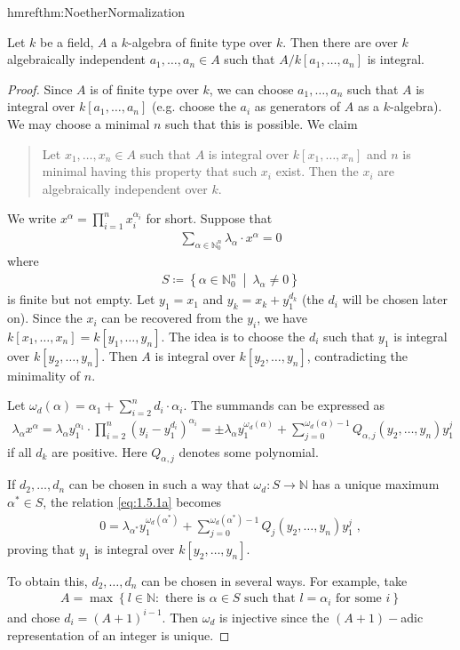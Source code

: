 \documentclass[DIV=14,parskip=full,pointednumbers]{scrartcl}
\theoremstyle{cthm}
\theoremstyle{cvarthm}
\theoremstyle{cdef}
\newcommand{\lbl}[1]{
	\label{#1}
	\edef\dummy{\curthm}
	\expandafter\xdef\csname thmref#1\endcsname{\dummy}
}
\newcommand{\IN}{\mathbb{N}}
\newcommand{\ldotspam}{,\ldots,}
\newcommand{\st}{\ \middle|\ }
\begin{document}
\begin{thm}\lbl{thm:NoetherNormalization}
 Let $k$ be a field, $A$ a $k$-algebra of finite type over $k$. Then there are over $k$ algebraically independent $a_1\ldotspam a_n\in A$ such that $A/k[a_1\ldotspam a_n]$ is integral.
\end{thm}
\begin{proof}
 Since $A$ is of finite type over $k$, we can choose $a_1,\ldots, a_n$ such that $A$ is integral over $k[a_1,\ldots, a_n]$ (e.g. choose the $a_i$ as generators of $A$ as a $k$-algebra). We may choose a minimal $n$ such that this is possible. We claim 
 \begin{quote}
  Let $x_1,\ldots, x_n\in A$ such that $A$ is integral over $k[x_1,\ldots,x_n]$ and $n$ is minimal having this property that such $x_i$ exist. Then the $x_i$ are algebraically independent over $k$.
 \end{quote}
We write $x^\alpha = \prod_{i=1}^n x_i^{\alpha_i}$ for short. Suppose that
\begin{align*}
\sum_{\alpha\in\IN_0^n} \lambda_\alpha \cdot x^\alpha =0\label{eq:1.5.1a}\tag{$*$}
\end{align*}
where 
\begin{align*}
 S\coloneqq \left\{\alpha\in\IN_0^n\st\lambda_\alpha\neq 0\right\}
\end{align*}
 is finite but not empty. Let $y_1=x_1$ and $y_k = x_k +y_1^{d_k}$ (the $d_i$ will be chosen later on). Since the $x_i$ can be recovered from the $y_i$, we have $k[x_1,\ldots,x_n] = k[y_1,\ldots,y_n]$. The idea is to choose the $d_i$ such that $y_1$ is integral over $k[y_2,\ldots,y_n]$. Then $A$ is integral over $k[y_2,\ldots,y_n]$, contradicting the minimality of $n$. 

Let $\omega_d(\alpha) =\alpha_1 +\sum_{i=2}^nd_i\cdot \alpha_i$. The summands can be expressed as 
\begin{align*}
 \lambda_\alpha x^\alpha = \lambda_\alpha y_1^{\alpha_1} \cdot\prod_{i=2}^n \left(y_i - y_1^{d_i}\right)^{\alpha_i}= \pm \lambda_\alpha y_1^{\omega_d(\alpha)} + \sum_{j=0}^{\omega_d(\alpha)-1} Q_{\alpha,j}(y_2,\ldots, y_n) y_1^j
\end{align*}
if all $d_k$ are positive. Here $Q_{\alpha, j}$ denotes some polynomial. 

If $d_2,\ldots, d_n$ can be chosen in such a way that $\omega_d: S\to \IN$ has a unique maximum $\alpha^\ast \in S$, the relation \eqref{eq:1.5.1a} becomes
\begin{align*}
 0 = \lambda_{\alpha^\ast} y_1^{\omega_d(\alpha^\ast)} +\sum_{j=0}^{\omega_d(\alpha^\ast)-1} Q_j(y_2,\ldots,y_n)y_1^j\;,
\end{align*}
proving that $y_1$ is integral over $k[y_2,\ldots,y_n]$. 

To obtain this, $d_2,\ldots,d_n$ can be chosen in several ways. For example, take
\begin{align*}
 A = \max\left\{l\in\IN: \text{ there is }\alpha\in S \text{ such that } l =\alpha_i \text{ for some } i\right\}
\end{align*}
and chose $d_i = (A+1)^{i-1}$. Then $\omega_d$ is injective since the $(A+1)-$adic representation of an integer is unique.
 \end{proof}
\end{document}
